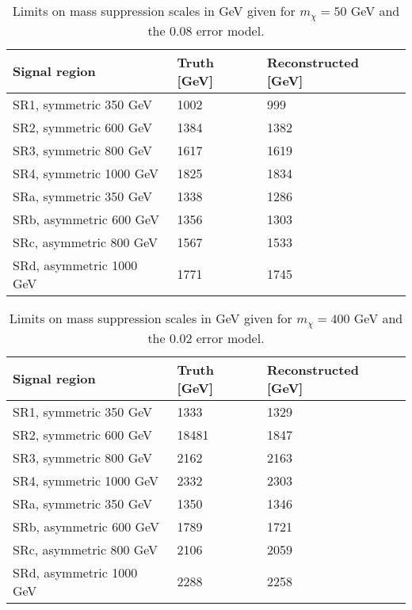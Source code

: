 \begin{table}[ht]
\begin{center}
\begin{tabular}{|l|l|l|}
\hline
Signal region & Truth [GeV]& Reconstructed [GeV]\\ \hline
SR1, symmetric 350 GeV&1002&999\\
SR2, symmetric 600 GeV&1384&1382\\
SR3, symmetric 800 GeV&1617&1619\\
SR4, symmetric 1000 GeV&1825&1834\\ \hline
SRa, symmetric 350 GeV&1338&1286\\
SRb, asymmetric 600 GeV&1356&1303\\
SRc, asymmetric 800 GeV&1567&1533\\
SRd, asymmetric 1000 GeV&1771&1745\\ \hline
\end{tabular}
\caption{Limits on mass suppression scales in GeV given for $m_{\chi}=50$ GeV and the 0.08 error model.}
\label{tab:masssupp010}
\end{center}
\end{table}

\begin{table}[ht!]
\begin{center}
\begin{tabular}{|l|l|l|}
\hline
Signal region & Truth [GeV]& Reconstructed [GeV]\\ \hline
SR1, symmetric 350 GeV &1333&1329\\
SR2, symmetric 600 GeV&18481&1847\\
SR3, symmetric 800 GeV&2162&2163\\
SR4, symmetric 1000 GeV&2332&2303\\ \hline
SRa, symmetric 350 GeV&1350&1346\\
SRb, asymmetric 600 GeV&1789&1721\\
SRc, asymmetric 800 GeV&2106&2059\\
SRd, asymmetric 1000 GeV&2288&2258\\ \hline
\end{tabular}
\caption{Limits on mass suppression scales in GeV given for $m_{\chi}=400$ GeV and the 0.02 error model.}
\label{tab:masssupp2002}
\end{center}
\end{table}

